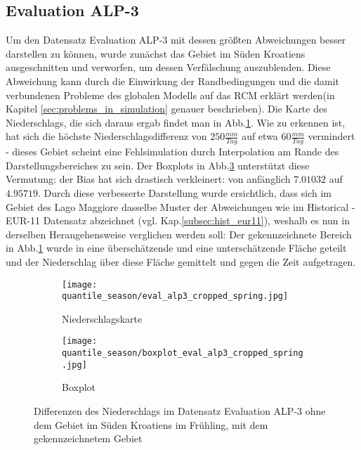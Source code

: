 \subsection{Evaluation ALP-3}\label{subsec:eval_alp3}
Um den Datensatz Evaluation ALP-3 mit dessen größten Abweichungen besser darstellen zu können, wurde zunächst das Gebiet im Süden Kroatiens ausgeschnitten und verworfen, um dessen Verfälschung auszublenden. Diese Abweichung kann durch die Einwirkung der Randbedingungen und die damit verbundenen Probleme des globalen Modells auf das RCM erklärt werden(in Kapitel \ref{sec:problems_in_simulation} genauer beschrieben). Die Karte des Niederschlags, die sich daraus ergab findet man in Abb.\ref{fig:seasons:cropped eval_alp_3}. Wie zu erkennen ist, hat sich die höchste Niederschlagsdifferenz von $250\frac{mm}{Tag}$ auf etwa $60\frac{mm}{Tag}$ vermindert - dieses Gebiet scheint eine Fehlsimulation durch Interpolation am Rande des Darstellungsbereiches zu sein. Der Boxplots in Abb.\ref{fig:seasons:cropped eval_alp_3_boxplot} unterstützt diese Vermutung: der Bias hat sich drastisch verkleinert: von anfänglich $7.01032$ auf $4.95719$. Durch diese verbesserte Darstellung wurde ersichtlich, dass sich im Gebiet des Lago Maggiore dasselbe Muster der Abweichungen wie im Historical - EUR-11 Datensatz abzeichnet (vgl. Kap.\ref{subsec:hist_eur11}), weshalb es nun in derselben Herangehensweise verglichen werden soll: Der gekennzeichnete Bereich in Abb.\ref{fig:seasons:cropped eval_alp_3} wurde in eine überschätzende und eine unterschätzende Fläche geteilt und der Niederschlag über diese Fläche gemittelt und gegen die Zeit aufgetragen.\\

\begin{figure}[h]
	\begin{subfigure}{0.49\textwidth}
		\texttt{[image: quantile\_season/eval\_alp3\_cropped\_spring.jpg]}
		\caption{Niederschlagskarte}
		\label{fig:seasons:cropped eval_alp_3}
	\end{subfigure}
	\begin{subfigure}{0.49\textwidth}
		\texttt{[image: quantile\_season/boxplot\_eval\_alp3\_cropped\_spring.jpg]}
		\caption{Boxplot}
		\label{fig:seasons:cropped eval_alp_3_boxplot}
	\end{subfigure}
	\caption{Differenzen des Niederschlags im Datensatz Evaluation ALP-3 ohne dem Gebiet im Süden Kroatiens im Frühling, mit dem gekennzeichnetem Gebiet}
\end{figure}

